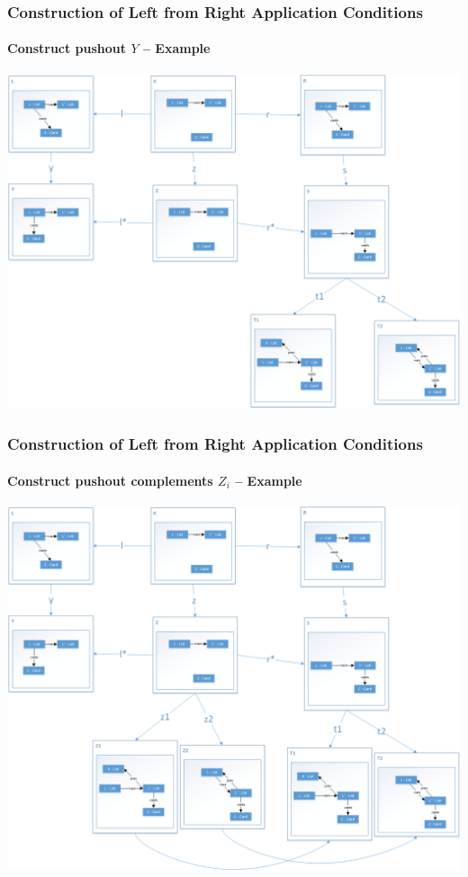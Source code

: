 \documentclass[32pt,t]{beamer}
\begin{document}
	\begin{frame}
		\frametitle{Construction of Left from Right Application Conditions}
		\framesubtitle{Construct pushout $Y$ -- Example}
		\centering
		\includegraphics[height=.8\textheight]{Images/53_RightAC-To-LeftAC_Example_Step3}
	\end{frame}

	\begin{frame}
		\frametitle{Construction of Left from Right Application Conditions}
		\framesubtitle{Construct pushout complements $Z_i$ -- Example}
		\centering
		\includegraphics[height=.8\textheight]{Images/54_RightAC-To-LeftAC_Example_Step4}
	\end{frame}
\end{document}
